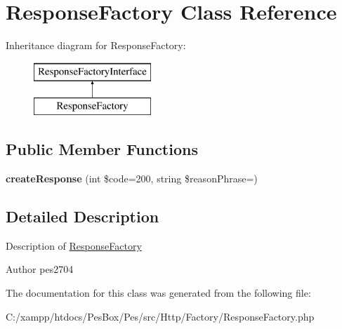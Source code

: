 \hypertarget{class_pes_1_1_http_1_1_factory_1_1_response_factory}{}\section{Response\+Factory Class Reference}
\label{class_pes_1_1_http_1_1_factory_1_1_response_factory}
Inheritance diagram for Response\+Factory\+:\begin{figure}[H]
\begin{center}
\leavevmode
\includegraphics[height=2.000000cm]{class_pes_1_1_http_1_1_factory_1_1_response_factory}
\end{center}
\end{figure}
\subsection*{Public Member Functions}
\begin{DoxyCompactItemize}
\item 
\mbox{\label{class_pes_1_1_http_1_1_factory_1_1_response_factory_ac24210fe6cf217f2d6d708eeee3af43a}} 
{\bfseries create\+Response} (int \$code=200, string \$reason\+Phrase=\textquotesingle{}\textquotesingle{})
\end{DoxyCompactItemize}


\subsection{Detailed Description}
Description of \mbox{\hyperlink{class_pes_1_1_http_1_1_factory_1_1_response_factory}{Response\+Factory}}

\begin{DoxyAuthor}{Author}
pes2704 
\end{DoxyAuthor}


The documentation for this class was generated from the following file\+:\begin{DoxyCompactItemize}
\item 
C\+:/xampp/htdocs/\+Pes\+Box/\+Pes/src/\+Http/\+Factory/Response\+Factory.\+php\end{DoxyCompactItemize}
